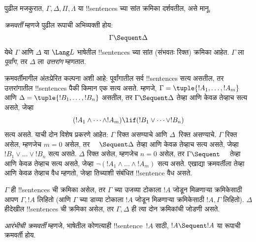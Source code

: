\documentclass[../../../include/open-logic-section]{subfiles}
\begin{document}
      {}
      {}


पुढील मजकुरात, $\Gamma, \Delta, \Pi, \Lambda$ या !!{sentence}s च्या सांत
क्रमिका दर्शवतील, असे मानू.

\begin{defn}[क्रमवर्ती]
\emph{क्रमवर्ती} म्हणजे पुढील रूपाची अभिव्यक्ती होय:
\[
\Gamma \Sequent \Delta
\]
येथे $\Gamma$ आणि $\Delta$ या $\Lang L$ भाषेतील !!{sentence}s च्या
सांत (संभवतः रिक्त) क्रमिका आहेत. $\Gamma$ ला \emph{पूर्वांग}, तर
$\Delta$ ला \emph{उत्तरांग} म्हणतात.
\end{defn}

\begin{explain}
क्रमवर्तीमागील अंतःप्रेरित कल्पना अशी आहे: पूर्वांगातील सर्व !!{sentence}s
सत्य असतील, तर उत्तरांगातील !!{sentence}s पैकी किमान एक सत्य असते. म्हणजे,
$\Gamma = \tuple{!A_1, \dots, !A_m}$ आणि
$\Delta = \tuple{!B_1, \dots, !B_n}$ असतील, तर $\Gamma \Sequent \Delta$
तेव्हा आणि केवळ तेव्हाच सत्य असते, जेव्हा
\[
(!A_1 \land \cdots \land !A_m) \lif (!B_1 \lor \cdots \lor
!B_n)
\]
सत्य असते. याची दोन विशेष प्रकरणे आहेत: $\Gamma$ रिक्त असण्याचे आणि
$\Delta$~रिक्त असण्याचे. $\Gamma$ रिक्त असेल, म्हणजेच $m = 0$ असेल, तर
$\quad \Sequent \Delta$ तेव्हा आणि केवळ तेव्हाच सत्य असते, जेव्हा
$!B_1 \lor \dots \lor !B_n$ सत्य असते. $\Delta$ रिक्त असेल, म्हणजेच
$n = 0$ असेल, तर $\Gamma \Sequent \quad$ तेव्हा आणि केवळ तेव्हाच सत्य
असते, जेव्हा $\lnot(!A_1 \land \dots \land !A_m)$ सत्य असते. एखाद्या
क्रमवर्तीला तेव्हा आणि केवळ तेव्हाच वैध म्हणतो, जेव्हा तिच्याशी संबंधित
!!{sentence} वैध असते.
\end{explain}

$\Gamma$ ही !!{sentence}s ची क्रमिका असेल, तर $\Gamma$ च्या उजव्या टोकाला
$!A$ जोडून मिळणाऱ्या क्रमिकेसाठी आपण $\Gamma, !A$ लिहितो (आणि $\Gamma$
च्या डाव्या टोकाला $!A$ जोडून मिळणाऱ्या क्रमिकेसाठी $!A, \Gamma$
लिहितो). $\Delta$ हीदेखील !!{sentence}s ची क्रमिका असेल, तर $\Gamma,
\Delta$ ही त्या दोन क्रमिकांची जोडणी असते.

\begin{defn}[आरंभीची क्रमवर्ती]
\emph{आरंभीची क्रमवर्ती} म्हणजे, भाषेतील कोणत्याही !!{sentence}~$!A$ साठी,
{$!A \Sequent !A$ या रूपाची क्रमवर्ती होय}.
\end{defn}
\end{document}
